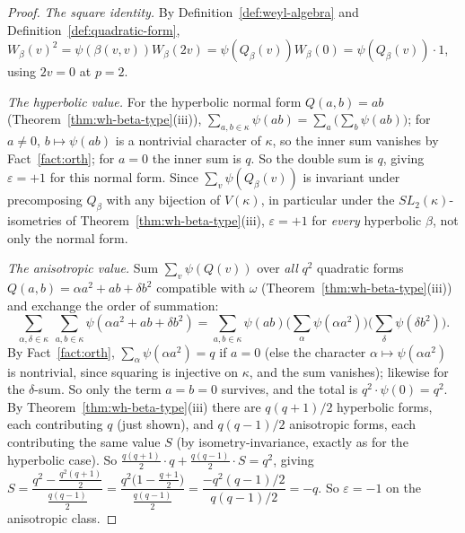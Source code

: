 
\begin{proof}
\emph{The square identity.} By Definition~\ref{def:weyl-algebra} and
Definition~\ref{def:quadratic-form}, $W_\beta(v)^2=\psi(\beta(v,v))W_\beta(2v)=\psi(Q_\beta(v))W_\beta(0)=\psi(Q_\beta(v))\cdot 1$,
using $2v=0$ at $p=2$.

\emph{The hyperbolic value.} For the hyperbolic normal form $Q(a,b)=ab$
(Theorem~\ref{thm:wh-beta-type}(iii)),
$\sum_{a,b\in\kappa}\psi(ab) = \sum_a\Big(\sum_b\psi(ab)\Big)$; for $a\neq 0$,
$b\mapsto\psi(ab)$ is a nontrivial character of $\kappa$, so the inner sum
vanishes by Fact~\ref{fact:orth}; for $a=0$ the inner sum is $q$. So the
double sum is $q$, giving $\varepsilon=+1$ for this normal form. Since
$\sum_v\psi(Q_\beta(v))$ is invariant under precomposing $Q_\beta$ with any
bijection of $V(\kappa)$, in particular under the $SL_2(\kappa)$-isometries
of Theorem~\ref{thm:wh-beta-type}(iii), $\varepsilon=+1$ for \emph{every}
hyperbolic $\beta$, not only the normal form.

\emph{The anisotropic value.} Sum $\sum_v\psi(Q(v))$ over \emph{all} $q^2$
quadratic forms $Q(a,b)=\alpha a^2+ab+\delta b^2$ compatible with $\omega$
(Theorem~\ref{thm:wh-beta-type}(iii)) and exchange the order of summation:
\[
\sum_{\alpha,\delta\in\kappa}\ \sum_{a,b\in\kappa}\psi(\alpha a^2+ab+\delta b^2)
= \sum_{a,b\in\kappa}\psi(ab)\Big(\sum_\alpha\psi(\alpha a^2)\Big)\Big(\sum_\delta\psi(\delta b^2)\Big).
\]
By Fact~\ref{fact:orth}, $\sum_\alpha\psi(\alpha a^2)=q$ if $a=0$ (else the
character $\alpha\mapsto\psi(\alpha a^2)$ is nontrivial, since squaring is
injective on $\kappa$, and the sum vanishes); likewise for the $\delta$-sum.
So only the term $a=b=0$ survives, and the total is $q^2\cdot\psi(0)=q^2$.
By Theorem~\ref{thm:wh-beta-type}(iii) there are $q(q+1)/2$ hyperbolic forms,
each contributing $q$ (just shown), and $q(q-1)/2$ anisotropic forms, each
contributing the same value $S$ (by isometry-invariance, exactly as for the
hyperbolic case). So
$\tfrac{q(q+1)}{2}\cdot q + \tfrac{q(q-1)}{2}\cdot S = q^2$, giving
$S = \dfrac{q^2 - \tfrac{q^2(q+1)}{2}}{\tfrac{q(q-1)}{2}} = \dfrac{q^2\big(1-\tfrac{q+1}{2}\big)}{\tfrac{q(q-1)}{2}}
= \dfrac{-q^2(q-1)/2}{q(q-1)/2} = -q$. So $\varepsilon=-1$ on the anisotropic
class.


\end{proof}
